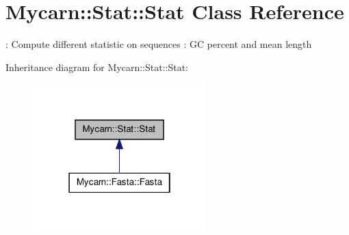 \hypertarget{classMycarn_1_1Stat_1_1Stat}{
\section{\-Mycarn\-:\-:\-Stat\-:\-:\-Stat \-Class \-Reference}
\label{classMycarn_1_1Stat_1_1Stat}
}


\-: \-Compute different statistic on sequences \-: \-G\-C percent and mean length  




\-Inheritance diagram for \-Mycarn\-:\-:\-Stat\-:\-:\-Stat\-:
\nopagebreak
\begin{figure}[H]
\begin{center}
\leavevmode
\includegraphics[width=190pt]{classMycarn_1_1Stat_1_1Stat__inherit__graph}
\end{center}
\end{figure}
